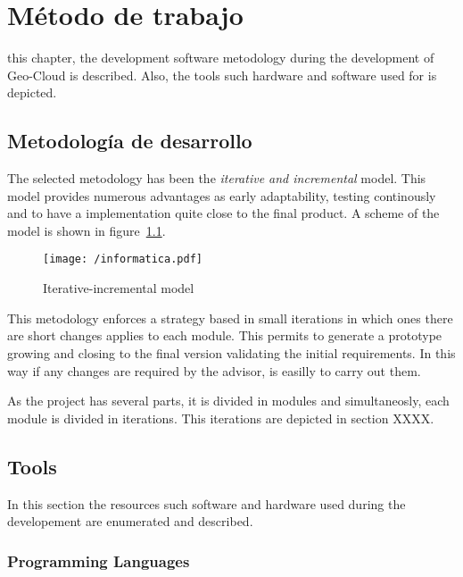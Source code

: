 \chapter{Método de trabajo}

 this chapter, the development software metodology during the
development of Geo-Cloud is described. Also, the tools such hardware and software used for is depicted.
 
\section{Metodología de desarrollo}

The selected metodology has been the \emph{iterative and incremental}
model. This model provides numerous advantages as early adaptability, testing
continously and to have a implementation quite close to the final product. A
scheme of the model is shown in figure~\ref{fig:IncrementalModel}.


\begin{figure}[!h]
\begin{center}
\texttt{[image: /informatica.pdf]}
\caption{Iterative-incremental model}
\label{fig:IncrementalModel}
\end{center}
\end{figure}

This metodology enforces a strategy based in small iterations in which ones
there are short changes applies to each module. This permits to generate a prototype
growing and closing to the final version validating the initial requirements. In
this way if any changes are required by the advisor, is easilly to carry out
them.
 
As the project has several parts, it is divided in modules and simultaneosly,
each module is divided in iterations. This iterations are depicted in section XXXX.

\section{Tools}

In this section the resources such software and hardware used during the
developement are enumerated and described.  



\subsection{Programming Languages}

